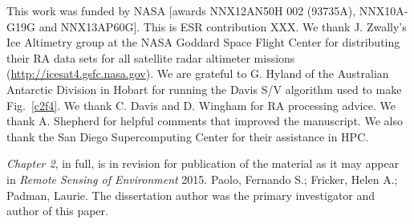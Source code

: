This work was funded by NASA [awards NNX12AN50H 002 (93735A), NNX10A-G19G and NNX13AP60G]. This is ESR contribution XXX. We thank J. Zwally's Ice Altimetry group at the NASA Goddard Space Flight Center for distributing their RA data sets for all satellite radar altimeter missions (\url{http://icesat4.gsfc.nasa.gov}). We are grateful to G. Hyland of the Australian Antarctic Division in Hobart for running the Davis S/V algorithm used to make Fig.~\ref{c2f4}. We thank C. Davis and D. Wingham for RA processing advice. We thank A. Shepherd for helpful comments that improved the manuscript. We also thank the San Diego Supercomputing Center for their assistance in HPC. 


{\sl Chapter 2}, in full, is in revision for publication of the material as it
may appear in {\it Remote Sensing of Environment} 2015. Paolo, Fernando S.;
Fricker, Helen A.; Padman, Laurie. The dissertation author was the primary
investigator and author of this paper.
